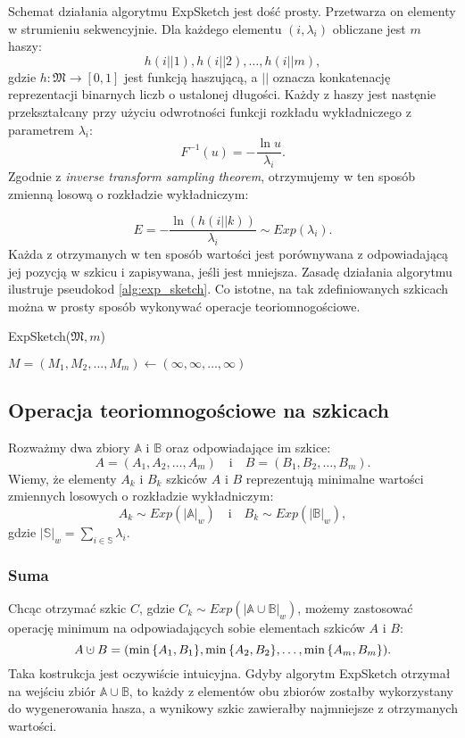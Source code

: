     Schemat działania algorytmu ExpSketch jest dość prosty. Przetwarza on elementy w strumieniu sekwencyjnie. Dla każdego elementu $(i, \lambda_{i})$ obliczane jest $m$ haszy:
    \[
        h(i || 1), h(i || 2), \dots, h(i || m),
    \]
    gdzie $h: \mathfrak{M} \rightarrow [0,1]$ jest funkcją haszującą, a $||$ oznacza konkatenację reprezentacji binarnych liczb o ustalonej długości. Każdy z haszy jest nastęnie przekształcany przy użyciu odwrotności funkcji rozkładu wykładniczego z parametrem $\lambda_i$:
    \[
        F^{-1}(u) = - \frac{\ln u}{\lambda_i}.
    \]
    Zgodnie z \textit{inverse transform sampling theorem}\cite{Devroye_1986a}, otrzymujemy w ten sposób zmienną losową o rozkładzie wykładniczym:

    \[
        E = - \frac{\ln(h(i || k))}{\lambda_i} \sim Exp(\lambda_i).
    \]
    Każda z otrzymanych w ten sposób wartości jest porównywana z odpowiadającą jej pozycją w szkicu i zapisywana, jeśli jest mniejsza. Zasadę działania algorytmu ilustruje pseudokod \ref{alg:exp_sketch}. Co istotne, na tak zdefiniowanych szkicach można w prosty sposób wykonywać operacje teoriomnogościowe. 

    \begin{algorithm}
        \caption{ExpSketch($\mathfrak{M}, m$)}\label{alg:exp_sketch}
        $M = (M_1, M_2, \dots, M_m) \gets (\infty, \infty, \dots, \infty)$\;
    \end{algorithm}

\subsection{Operacja teoriomnogościowe na szkicach}
    Rozważmy dwa zbiory $\mathbb{A}$ i $\mathbb{B}$ oraz odpowiadające im szkice: 
    \[
        A = (A_1, A_2, \dots, A_m) \quad \text{i} \quad B = (B_1, B_2, \dots, B_m).  
    \]
    Wiemy, że elementy $A_k$ i $B_k$ szkiców $A$ i $B$ reprezentują minimalne wartości zmiennych losowych o rozkładzie wykładniczym:
    \[
        A_k \sim Exp(|\mathbb{A}|_{w}) \quad \text{i} \quad B_k \sim Exp(|\mathbb{B}|_{w}), 
    \]
    gdzie $|\mathbb{S}|_{w} = \sum\limits_{i \in \mathbb{S}}\lambda_i$. 
    \subsubsection*{Suma}
    Chcąc otrzymać szkic $C$, gdzie $C_k \sim Exp(|\mathbb{A} \cup \mathbb{B}|_{w})$, możemy zastosować operację minimum na odpowiadających sobie elementach szkiców $A$ i $B$:    
    \[
        A \mathbin{\mathaccent\cdot\cup} B = (\min{\{A_1, B_1\}}, \min{\{A_2, B_2\}}, \dots, \min{\{A_m, B_m\}}).
    \]
    Taka kostrukcja jest oczywiście intuicyjna. Gdyby algorytm ExpSketch otrzymał na wejściu zbiór $\mathbb{A} \cup \mathbb{B}$, to każdy z elementów obu zbiorów zostałby wykorzystany do wygenerowania hasza, a wynikowy szkic zawierałby najmniejsze z otrzymanych wartości.
    
